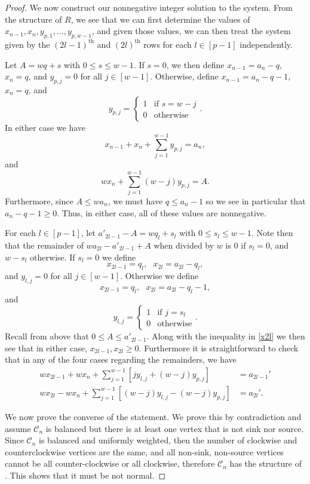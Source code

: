 \documentclass [12pt,a4paper,reqno]{amsart}
\theoremstyle{plain}
\theoremstyle{definition}
\newtheorem{Assumptions and Discussion}[Theorem]{Assumptions and Discussion}
\theoremstyle{remark}
\newcommand\calC{\mathcal{C}}
\begin{document}
\begin{proof}
We now construct our nonnegative integer solution to the system. From the structure of $R$, we see that we can first determine the values of $x_{n-1}, x_n,y_{p,1},\dots,y_{p,w-1}$, and given those values, we can then treat the system given by the $(2l-1)^\text{th}$ and $(2l)^\text{th}$ rows for each $l\in[p-1]$ independently.

Let $A = wq+s$ with $0\leq s\leq w-1$. If $s=0$, we then define $x_{n-1}=a_n-q$, $x_n=q$, and $y_{p,j}=0$ for all $j\in[w-1]$. Otherwise, define $x_{n-1}=a_n-q-1$, $x_n=q$, and 
\[
    y_{p,j}=
    \begin{cases}
        1 & \text{if }s = w-j\\
        0 & \text{otherwise}
    \end{cases}.
\]
In either case we have 
\[
    x_{n-1}+x_n+\sum_{j=1}^{w-1}y_{p,j}=a_n, 
\]
and
\[
    wx_n+\sum_{j=1}^{w-1}(w-j)y_{p,j}=A.
\]
Furthermore, since $A\leq wa_n$, we must have $q\leq a_n-1$ so we see in particular that $a_n-q-1\geq 0$. Thus, in either case, all of these values are nonnegative. 

For each $l\in[p-1]$, let $a'_{2l-1}-A=wq_l+s_l$ with $0\leq s_l\leq w-1$. Note then that the remainder of $wa_{2l}-a'_{2l-1}+A$ when divided by $w$ is \(0\) if \(s_l=0\), and $w-s_l$ otherwise. If $s_l=0$ we define
\[
    x_{2l-1}=q_l,~~~x_{2l}=a_{2l}-q_l,
\]
and $y_{l,j}=0$ for all $j\in[w-1]$. Otherwise we define
\[
    x_{2l-1}=q_l,~~~x_{2l}=a_{2l}-q_l-1,
\]
and
\[
    y_{l,j}=
    \begin{cases}
        1 & \text{if }j=s_l\\
        0 & \text{otherwise}
    \end{cases}.
\]
Recall from above that $0\leq A\leq a'_{2l-1}$. Along with the inequality in \ref{x2l} we then see that in either case, $x_{2l-1},x_{2l}\geq 0$. Furthermore it is straightforward to check that in any of the four cases regarding the remainders, we have
\begin{align*}
wx_{2l-1}+wx_n+\sum_{j=1}^{w-1}\left[jy_{l,j}+(w-j)y_{p,j}\right] &= a_{2l-1}'\\
wx_{2l}-wx_n+\sum_{j=1}^{w-1}\left[(w-j)y_{l,j}-(w-j)y_{p,j}\right] &= a_{2l}'.
\end{align*}

We now prove the converse of the statement. We prove this by contradiction and assume $\calC_n$ is balanced but there is at least one vertex that is not sink nor source. Since $\calC_n$ is balanced and uniformly weighted, then the number of clockwise and counterclockwise vertices are the same, and all non-sink, non-source vertices cannot be all counter-clockwise or all clockwise, therefore $\calC_n$ has the structure of . This shows that it must be not normal. 
\end{proof}
\end{document}
